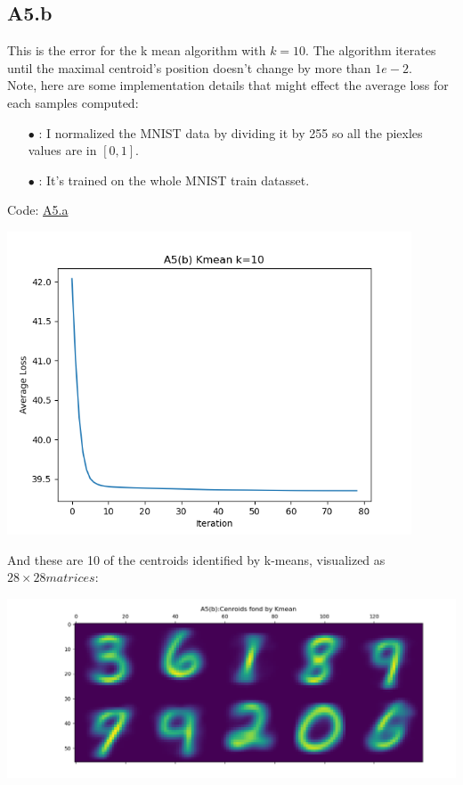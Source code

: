\documentclass[]{article}
\begin{document}
    \subsection*{A5.b}
        This is the error for the k mean algorithm with $k = 10$. The algorithm iterates until the maximal centroid's position doesn't change by more than $1e-2$. 
        \\[1.1em]
        Note, here are some implementation details that might effect the average loss for each samples computed: 
        \begin{enumerate}
            \item[$\bullet$]: I normalized the MNIST data by dividing it by 255 so all the piexles values are in $[0, 1]$. 
            \item[$\bullet$]: It's trained on the whole MNIST train datasset.  
        \end{enumerate}
        Code: \hyperref[A5.a]{A5.a}
        \begin{center}
            \includegraphics*[width=12cm]{A5bplots/23-09-12-A5b-k=10-losses.png}    
        \end{center}    
        And these are 10 of the centroids identified by k-means, visualized as $28\times 28 matrices$: 
        \begin{center}
            \includegraphics*[width=14cm]{A5bplots/23-09-12-A5b-k=10-centroids.png}
        \end{center}
\end{document}
